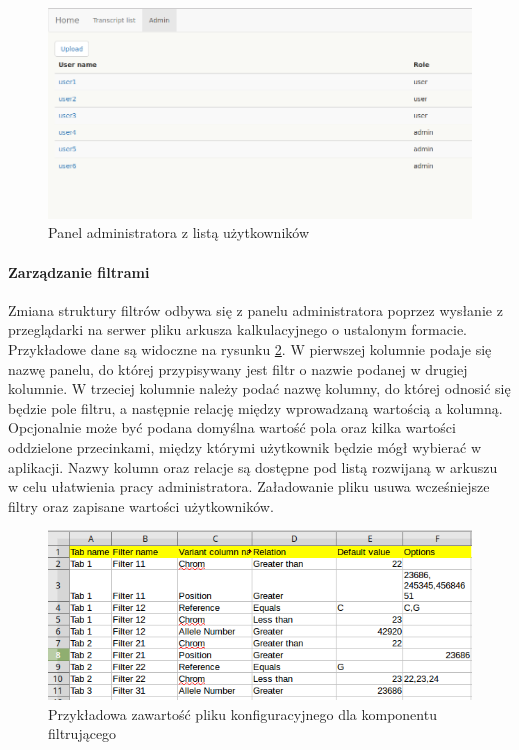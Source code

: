 \documentclass[a4paper,12pt,twoside]{article}
\begin{document}
\begin{figure}[h]
\centering
\includegraphics[width=\textwidth]{obrazy/aplikacja/admin.png}
\caption{Panel administratora z listą użytkowników}
\label{fig:adminpic}
\end{figure}

\newpage
\paragraph{Zarządzanie filtrami}

Zmiana struktury filtrów odbywa się z panelu administratora poprzez wysłanie
z przeglądarki na serwer pliku arkusza kalkulacyjnego o ustalonym formacie. Przykładowe dane są widoczne na rysunku \ref{fig:input_filepic}.
W pierwszej kolumnie podaje się nazwę panelu, do której przypisywany
jest filtr o nazwie podanej w drugiej kolumnie. W trzeciej kolumnie należy podać nazwę kolumny, do której
odnosić się będzie pole filtru, a następnie relację między wprowadzaną wartością a kolumną.
Opcjonalnie może być podana domyślna wartość pola oraz kilka wartości oddzielone przecinkami, między którymi użytkownik będzie mógł wybierać w aplikacji. Nazwy kolumn oraz relacje są dostępne pod
listą rozwijaną w arkuszu w celu ułatwienia pracy administratora.
Załadowanie pliku usuwa wcześniejsze filtry oraz zapisane wartości użytkowników.

\begin{figure}[h!]
\centering
\includegraphics[width=\textwidth]{obrazy/aplikacja/input_file.png}
\caption{Przykładowa zawartość pliku konfiguracyjnego dla komponentu filtrującego}
\label{fig:input_filepic}
\end{figure}
\end{document}
